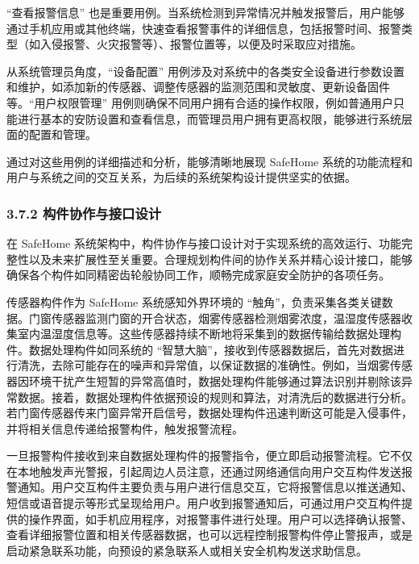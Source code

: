 ``查看报警信息'' 也是重要用例。当系统检测到异常情况并触发报警后，用户能够通过手机应用或其他终端，快速查看报警事件的详细信息，包括报警时间、报警类型（如入侵报警、火灾报警等）、报警位置等，以便及时采取应对措施。

从系统管理员角度，``设备配置'' 用例涉及对系统中的各类安全设备进行参数设置和维护，如添加新的传感器、调整传感器的监测范围和灵敏度、更新设备固件等。``用户权限管理'' 用例则确保不同用户拥有合适的操作权限，例如普通用户只能进行基本的安防设置和查看信息，而管理员用户拥有更高权限，能够进行系统层面的配置和管理。

通过对这些用例的详细描述和分析，能够清晰地展现 SafeHome 系统的功能流程和用户与系统之间的交互关系，为后续的系统架构设计提供坚实的依据。

\hypertarget{ux6784ux4ef6ux534fux4f5cux4e0eux63a5ux53e3ux8bbeux8ba1}{%
\subsubsection{3.7.2 构件协作与接口设计}\label{ux6784ux4ef6ux534fux4f5cux4e0eux63a5ux53e3ux8bbeux8ba1}}

在 SafeHome 系统架构中，构件协作与接口设计对于实现系统的高效运行、功能完整性以及未来扩展性至关重要。合理规划构件间的协作关系并精心设计接口，能够确保各个构件如同精密齿轮般协同工作，顺畅完成家庭安全防护的各项任务。



传感器构件作为 SafeHome 系统感知外界环境的 ``触角''，负责采集各类关键数据。门窗传感器监测门窗的开合状态，烟雾传感器检测烟雾浓度，温湿度传感器收集室内温湿度信息等。这些传感器持续不断地将采集到的数据传输给数据处理构件。数据处理构件如同系统的 ``智慧大脑''，接收到传感器数据后，首先对数据进行清洗，去除可能存在的噪声和异常值，以保证数据的准确性。例如，当烟雾传感器因环境干扰产生短暂的异常高值时，数据处理构件能够通过算法识别并剔除该异常数据。接着，数据处理构件依据预设的规则和算法，对清洗后的数据进行分析。若门窗传感器传来门窗异常开启信号，数据处理构件迅速判断这可能是入侵事件，并将相关信息传递给报警构件，触发报警流程。


一旦报警构件接收到来自数据处理构件的报警指令，便立即启动报警流程。它不仅在本地触发声光警报，引起周边人员注意，还通过网络通信向用户交互构件发送报警通知。用户交互构件主要负责与用户进行信息交互，它将报警信息以推送通知、短信或语音提示等形式呈现给用户。用户收到报警通知后，可通过用户交互构件提供的操作界面，如手机应用程序，对报警事件进行处理。用户可以选择确认报警、查看详细报警位置和相关传感器数据，也可以远程控制报警构件停止警报声，或是启动紧急联系功能，向预设的紧急联系人或相关安全机构发送求助信息。

